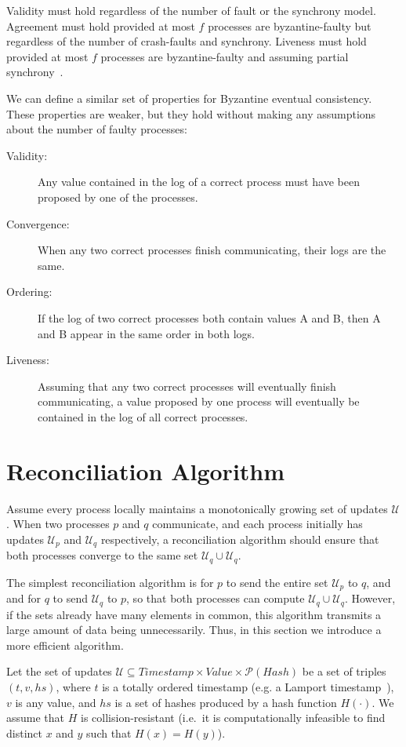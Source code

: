 \documentclass[manuscript]{acmart}
\begin{document}
Validity must hold regardless of the number of fault or the synchrony model.
Agreement must hold provided at most $f$ processes are byzantine-faulty but regardless of the number of crash-faults and synchrony. 
Liveness must hold provided at most $f$ processes are byzantine-faulty and assuming partial synchrony~\cite{Dwork:1988}.

We can define a similar set of properties for Byzantine eventual consistency.
These properties are weaker, but they hold without making any assumptions about the number of faulty processes:

\begin{description}
\item[Validity:] Any value contained in the log of a correct process must have been proposed by one of the processes.
\item[Convergence:] When any two correct processes finish communicating, their logs are the same.
\item[Ordering:] If the log of two correct processes both contain values A and B, then A and B appear in the same order in both logs.
\item[Liveness:] Assuming that any two correct processes will eventually finish communicating, a value proposed by one process will eventually be contained in the log of all correct processes.
\end{description}

\section{Reconciliation Algorithm}

Assume every process locally maintains a monotonically growing set of updates $\mathcal{U}$.
When two processes $p$ and $q$ communicate, and each process initially has updates $\mathcal{U}_p$ and $\mathcal{U}_q$ respectively, a reconciliation algorithm should ensure that both processes converge to the same set $\mathcal{U}_q \cup \mathcal{U}_q$.

The simplest reconciliation algorithm is for $p$ to send the entire set $\mathcal{U}_p$ to $q$, and and for $q$ to send $\mathcal{U}_q$ to $p$, so that both processes can compute $\mathcal{U}_q \cup \mathcal{U}_q$.
However, if the sets already have many elements in common, this algorithm transmits a large amount of data being unnecessarily.
Thus, in this section we introduce a more efficient algorithm.

Let the set of updates $\mathcal{U} \subseteq \mathit{Timestamp} \times \mathit{Value} \times \mathcal{P}(\mathit{Hash})$ be a set of triples $(t, v, \mathit{hs})$, where $t$ is a totally ordered timestamp (e.g. a Lamport timestamp~\cite{Lamport:1978}), $v$ is any value, and $\mathit{hs}$ is a set of hashes produced by a hash function $H(\cdot)$.
We assume that $H$ is collision-resistant (i.e.\ it is computationally infeasible to find distinct $x$ and $y$ such that $H(x) = H(y)$).
\end{document}
